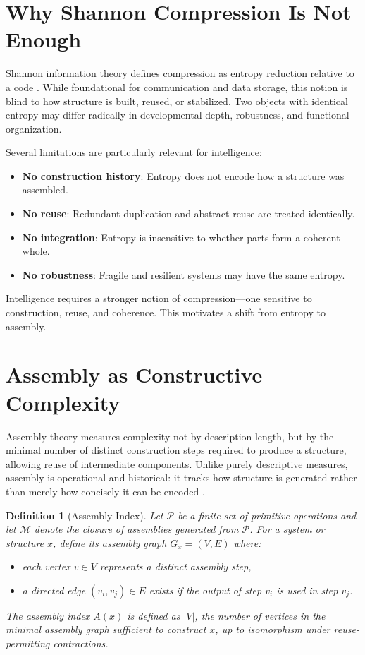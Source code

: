 \documentclass[11pt,letterpaper]{article}
\newtheorem{definition}{Definition}
\begin{document}
\section{Why Shannon Compression Is Not Enough}

Shannon information theory defines compression as entropy reduction relative to a code \parencite{shannon1948}. While foundational for communication and data storage, this notion is blind to how structure is built, reused, or stabilized. Two objects with identical entropy may differ radically in developmental depth, robustness, and functional organization.

Several limitations are particularly relevant for intelligence:
\begin{itemize}
\item \textbf{No construction history}: Entropy does not encode how a structure was assembled.
\item \textbf{No reuse}: Redundant duplication and abstract reuse are treated identically.
\item \textbf{No integration}: Entropy is insensitive to whether parts form a coherent whole.
\item \textbf{No robustness}: Fragile and resilient systems may have the same entropy.
\end{itemize}

Intelligence requires a stronger notion of compression—one sensitive to construction, reuse, and coherence. This motivates a shift from entropy to assembly.

\section{Assembly as Constructive Complexity}

Assembly theory measures complexity not by description length, but by the minimal number of distinct construction steps required to produce a structure, allowing reuse of intermediate components. Unlike purely descriptive measures, assembly is operational and historical: it tracks how structure is generated rather than merely how concisely it can be encoded \parencite{walker2022}.

\begin{definition}[Assembly Index]
Let $\mathcal{P}$ be a finite set of primitive operations and let $\mathcal{M}$ denote the closure of assemblies generated from $\mathcal{P}$. For a system or structure $x$, define its \emph{assembly graph} $G_x = (V,E)$ where:
\begin{itemize}
\item each vertex $v \in V$ represents a distinct assembly step,
\item a directed edge $(v_i,v_j) \in E$ exists if the output of step $v_i$ is used in step $v_j$.
\end{itemize}
The assembly index $A(x)$ is defined as $|V|$, the number of vertices in the minimal assembly graph sufficient to construct $x$, up to isomorphism under reuse-permitting contractions.
\end{definition}
\end{document}
